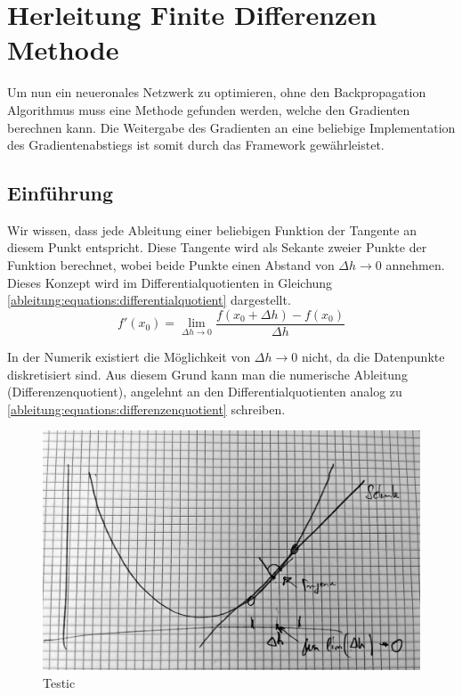 \section{Herleitung Finite Differenzen Methode\label{ableitung:section:herleitung_fdm}}
Um nun ein neueronales Netzwerk zu optimieren, ohne den Backpropagation Algorithmus muss eine Methode gefunden werden, welche den Gradienten berechnen kann. Die Weitergabe des Gradienten an eine beliebige Implementation des Gradientenabstiegs ist somit durch das Framework gewährleistet.
\\
\subsection{Einführung}
Wir wissen, dass jede Ableitung einer beliebigen Funktion der Tangente an diesem Punkt entspricht. Diese Tangente wird als Sekante zweier Punkte der Funktion berechnet, wobei beide Punkte einen Abstand von $\Delta h \rightarrow 0$ annehmen. Dieses Konzept wird im Differentialquotienten in Gleichung \ref{ableitung:equations:differentialquotient} dargestellt.
\begin{equation}
f'(x_0) = \lim_{{\Delta h} \rightarrow 0} \frac{f(x_0+\Delta h) - f(x_0)}{\Delta h}
\label{ableitung:equations:differentialquotient}
\end{equation}

In der Numerik existiert die Möglichkeit von $\Delta h \rightarrow 0$ nicht, da die Datenpunkte diskretisiert sind. Aus diesem Grund kann man die numerische Ableitung (Differenzenquotient), angelehnt an den Differentialquotienten analog zu \ref{ableitung:equations:differenzenquotient} schreiben.

\begin{figure}
	\begin{center}
		\includegraphics[width=12cm]{papers/ableitung/images/sekante_bsp.jpg}
		\caption{Testic}
		\label{ableitung:fig:ableitung_bsp}
	\end{center}
\end{figure}

